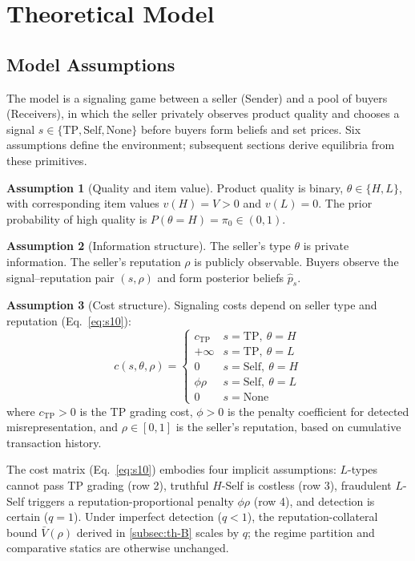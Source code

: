 \documentclass[11pt,letterpaper]{article}
\theoremstyle{definition}
\newtheorem{assumption}{Assumption}
\begin{document}
\FloatBarrier
\clearpage
\section{Theoretical Model}\label{sec:si-theory}

\subsection{Model Assumptions}\label{subsec:th-A}

The model is a signaling game between a seller (Sender) and a pool of buyers (Receivers), in which the seller privately observes product quality and chooses a signal $s \in \{\text{TP}, \text{Self}, \text{None}\}$ before buyers form beliefs and set prices. Six assumptions define the environment; subsequent sections derive equilibria from these primitives.

\begin{assumption}[Quality and item value]
Product quality is binary, $\theta \in \{H, L\}$, with corresponding item values $v(H) = V > 0$ and $v(L) = 0$. The prior probability of high quality is $P(\theta = H) = \pi_0 \in (0, 1)$.
\end{assumption}

\begin{assumption}[Information structure]
The seller's type $\theta$ is private information. The seller's reputation $\rho$ is publicly observable. Buyers observe the signal--reputation pair $(s, \rho)$ and form posterior beliefs $\hat{p}_s$.
\end{assumption}

\begin{assumption}[Cost structure]
Signaling costs depend on seller type and reputation (Eq.~\ref{eq:s10}):
\begin{equation}
c(s, \theta, \rho) = \begin{cases} c_{\text{TP}} & s = \text{TP},\ \theta = H \\ +\infty & s = \text{TP},\ \theta = L \\ 0 & s = \text{Self},\ \theta = H \\ \phi\rho & s = \text{Self},\ \theta = L \\ 0 & s = \text{None} \end{cases} \label{eq:s10}
\end{equation}
where $c_{\text{TP}} > 0$ is the TP grading cost, $\phi > 0$ is the penalty coefficient for detected misrepresentation, and $\rho \in [0,1]$ is the seller's reputation, based on cumulative transaction history.

The cost matrix (Eq.~\ref{eq:s10}) embodies four implicit assumptions: $L$-types cannot pass TP grading (row 2), truthful $H$-Self is costless (row 3), fraudulent $L$-Self triggers a reputation-proportional penalty $\phi\rho$ (row 4), and detection is certain ($q = 1$). Under imperfect detection ($q < 1$), the reputation-collateral bound $\bar{V}(\rho)$ derived in \ref{subsec:th-B} scales by $q$; the regime partition and comparative statics are otherwise unchanged.
\end{assumption}
\end{document}
